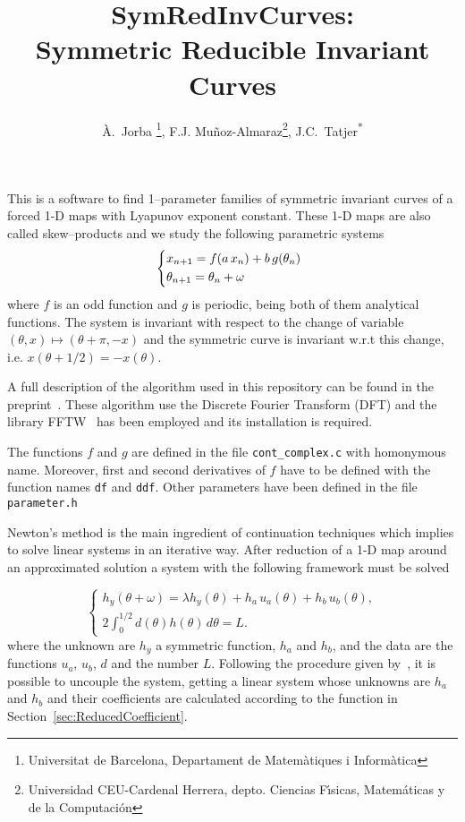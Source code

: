 \documentclass{article}
\title{SymRedInvCurves:\\ Symmetric Reducible Invariant Curves }
\author{\`A.~Jorba \footnote{Universitat de Barcelona, Departament de
    Matem\`atiques i Inform\`atica  }, F.J. Mu\~noz-Almaraz\footnote{Universidad CEU-Cardenal Herrera, depto. Ciencias
  F\'{\i}sicas, Matem\'aticas y de la Computaci\'on }, J.C.~Tatjer\textsuperscript{*}}
\begin{document}
 

\maketitle




This is a software to find 1--parameter families of symmetric invariant curves of a forced 1-D
maps with Lyapunov exponent constant. These 1-D maps are also called
skew--products and we study the following parametric systems
\begin{equation} \label{eq:system}
\left \{ 
\begin{array}{@{}l}
x_{n+1}=f(a\,x_n)+ b\, g(\theta_n) 
\\
\noalign{\smallskip}
\theta_{n+1}=\theta_n +\omega
\end{array} 
\right .
\end{equation} 
where $f$ is an odd function and $g$ is periodic, being both of them
analytical functions. The system is
invariant  with respect to the change of variable  $(\theta,x)\mapsto
(\theta+\pi,-x)$ and the symmetric curve is invariant w.r.t this
change, i.e. $x(\theta+1/2)=-x(\theta)$. 

A full description of the algorithm used in this repository  can be found in the
preprint~\cite{Angel16}.  These algorithm use the Discrete Fourier
Transform (DFT) and  the library
FFTW~\cite{FFTW} has been employed and its installation is required. 

The functions $f$ and $g$ are defined in the file
\texttt{cont\_complex.c} with 	homonymous name. Moreover, first and
second derivatives of $f$ have to be defined with the function names
\texttt{df} and \texttt{ddf}. Other parameters have been defined in
the file \texttt{parameter.h}



 

Newton's method is the main ingredient of continuation techniques
which implies to solve  linear systems in an iterative way. After reduction of a
1-D map around an approximated solution a system with the following
framework must be solved 

\begin{equation}\label{sist_exp_liap_const}
\left \{
\begin{array}{l}
h_y(\theta+\omega)=\lambda h_y(\theta) +h_a \,
u_a(\theta)+h_b\,u_b(\theta), \\
2 \int^{1/2}_0 d(\theta) h(\theta) \, d\theta=L.
\end{array}
\right .
\end{equation} 
where the unknown are $h_y$ a symmetric function, $h_a$ and $h_b$, and
the data are the functions $u_a$, $u_b$, $d$ and the number
$L$. Following the procedure given by~\cite{Angel16}, it is possible to
uncouple the system, getting a linear system whose unknowns are $h_a$
and $h_b$ and their coefficients are calculated according to the
function in Section~\ref{sec:ReducedCoefficient}.
\end{document}
